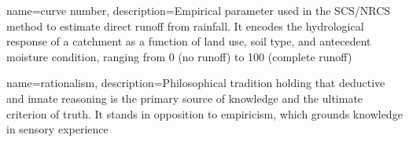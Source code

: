 
{
    name=curve number,
    description={Empirical parameter used in the SCS/NRCS method to estimate direct runoff from rainfall. It encodes the hydrological response of a catchment as a function of land use, soil type, and antecedent moisture condition, ranging from 0 (no runoff) to 100 (complete runoff)}
}

{
    name=rationalism,
    description={Philosophical tradition holding that deductive and innate reasoning is the primary source of knowledge and the ultimate criterion of truth. It stands in opposition to empiricism, which grounds knowledge in sensory experience}
}